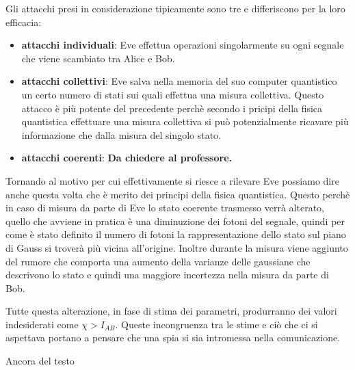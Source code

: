 Gli attacchi presi in considerazione tipicamente sono tre e differiscono per la loro efficacia:
\begin{itemize}
\item \textbf{attacchi individuali}: Eve effettua operazioni singolarmente su ogni segnale che viene scambiato tra Alice e Bob. 
\item \textbf{attacchi collettivi}: Eve salva nella memoria del suo computer quantistico un certo numero di stati sui quali effettua una misura collettiva. Questo attacco \`e pi\`u potente del precedente perch\`e secondo i pricipi della fisica quantistica effettuare una misura collettiva si pu\`o potenzialmente ricavare pi\`u informazione che dalla misura del singolo stato. 
\item \textbf{attacchi coerenti}: \textbf{Da chiedere al professore.}
\end{itemize} 

Tornando al motivo per cui effettivamente si riesce a rilevare Eve possiamo dire anche questa volta che \`e merito dei principi della fisica quantistica. Questo perch\`e in caso di misura da parte di Eve lo stato coerente trasmesso verr\`a alterato, quello che avviene in pratica \`e una diminuzione dei fotoni del segnale, quindi per come \`e stato definito il numero di fotoni la rappresentazione dello stato sul piano di Gauss si trover\`a pi\`u vicina all'origine. Inoltre durante la misura viene aggiunto del rumore che comporta una aumento della varianze delle gaussiane che descrivono lo stato e quindi una maggiore incertezza nella misura da parte di Bob.

Tutte questa alterazione, in fase di stima dei parametri, produrranno dei valori indesiderati come $\chi > I_{AB}$. Queste incongruenza tra le stime e ci\`o che ci si aspettava portano a pensare che una spia si sia intromessa nella comunicazione. 


Ancora del testo

